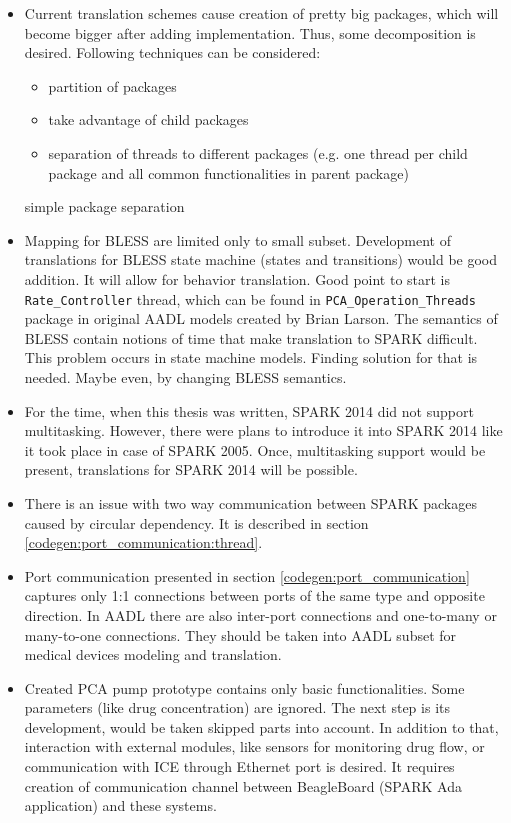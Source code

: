\begin{itemize}
	\item Current translation schemes cause creation of pretty big packages, which will become bigger after adding implementation. Thus, some decomposition is desired. Following techniques can be considered: 
		\begin{itemize}
			\item partition of packages
			\item take advantage of child packages
			\item separation of threads to different packages (e.g. one thread per child package and all common functionalities in parent package)
		\end{itemize} simple package separation
	\item Mapping for BLESS are limited only to small subset. Development of translations for BLESS state machine (states and transitions) would be good addition. It will allow for behavior translation. Good point to start is \lstinline{Rate_Controller} thread, which can be found in \lstinline{PCA_Operation_Threads} package in original AADL models created by Brian Larson. The semantics of BLESS contain notions of time that make translation to SPARK difficult. This problem occurs in state machine models. Finding solution for that is needed. Maybe even, by changing BLESS semantics.
	\item For the time, when this thesis was written, SPARK 2014 did not support multitasking. However, there were plans to introduce it into SPARK 2014 like it took place in case of SPARK 2005. Once, multitasking support would be present, translations for SPARK 2014 will be possible.
	\item There is an issue with two way communication between SPARK packages caused by circular dependency. It is described in section \ref{codegen:port_communication:thread}.
	\item Port communication presented in section \ref{codegen:port_communication} captures only 1:1 connections between ports of the same type and opposite direction. In AADL there are also inter-port connections and one-to-many or many-to-one connections. \cite{AadlBook} They should be taken into AADL subset for medical devices modeling and translation. 
	\item Created PCA pump prototype contains only basic functionalities. Some parameters (like drug concentration) are ignored. The next step is its development, would be taken skipped parts into account. In addition to that, interaction with external modules, like sensors for monitoring drug flow, or communication with ICE through Ethernet port is desired. It requires creation of communication channel 	between BeagleBoard (SPARK Ada application) and these systems. 		
\end{itemize}
